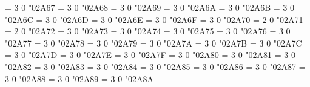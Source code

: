 \Umathchardef\dotequiv = 3 0 "02A67 %
\Umathchardef\equivVert = 3 0 "02A68 %
\Umathchardef\equivVvert = 3 0 "02A69 %
\Umathchardef\dotsim = 3 0 "02A6A %
\Umathchardef\simrdots = 3 0 "02A6B %
\Umathchardef\simminussim = 3 0 "02A6C %
\Umathchardef\congdot = 3 0 "02A6D %
\Umathchardef\asteq = 3 0 "02A6E %
\Umathchardef\hatapprox = 3 0 "02A6F %
\Umathchardef\approxeqq = 3 0 "02A70 %
\Umathchardef\eqqplus = 2 0 "02A71 %
\Umathchardef\pluseqq = 2 0 "02A72 %
\Umathchardef\eqqsim = 3 0 "02A73 %
\Umathchardef\Coloneq = 3 0 "02A74 %
\Umathchardef\eqeq = 3 0 "02A75 %
\Umathchardef\eqeqeq = 3 0 "02A76 %
\Umathchardef\ddotseq = 3 0 "02A77 %
\Umathchardef\equivDD = 3 0 "02A78 %
\Umathchardef\ltcir = 3 0 "02A79 %
\Umathchardef\gtcir = 3 0 "02A7A %
\Umathchardef\ltquest = 3 0 "02A7B %
\Umathchardef\gtquest = 3 0 "02A7C %
\Umathchardef\leqslant = 3 0 "02A7D %
\Umathchardef\geqslant = 3 0 "02A7E %
\Umathchardef\lesdot = 3 0 "02A7F %
\Umathchardef\gesdot = 3 0 "02A80 %
\Umathchardef\lesdoto = 3 0 "02A81 %
\Umathchardef\gesdoto = 3 0 "02A82 %
\Umathchardef\lesdotor = 3 0 "02A83 %
\Umathchardef\gesdotol = 3 0 "02A84 %
\Umathchardef\lessapprox = 3 0 "02A85 %
\Umathchardef\gtrapprox = 3 0 "02A86 %
\Umathchardef\lneq = 3 0 "02A87 %
\Umathchardef\gneq = 3 0 "02A88 %
\Umathchardef\lnapprox = 3 0 "02A89 %
\Umathchardef\gnapprox = 3 0 "02A8A %
